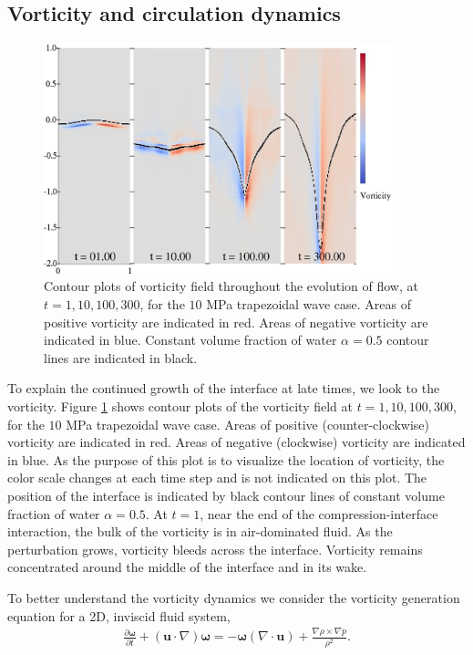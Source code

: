 \subsection{Vorticity and circulation dynamics}
\begin{figure}[h] 
  \centering
  \includegraphics[width=0.9\textwidth]{./figs/lung_figs/snapshots_vorticity_t1}
  \caption[The evolution of the vorticity] {Contour plots of vorticity
    field throughout the evolution of flow, at
    $t=1, 10, 100, 300$, for the $10$ MPa trapezoidal wave case. Areas
    of positive vorticity are indicated in red. Areas of negative
    vorticity are indicated in blue. Constant volume fraction of 
    water $\alpha=0.5$ contour lines are indicated in black.}
  \label{fig:vorticity_snapshots}
\end{figure}
% 
To explain the continued growth of the interface at late times, we
look to the vorticity. Figure \ref{fig:vorticity_snapshots} shows
contour plots of the vorticity field at $t=1, 10, 100, 300$, for the
$10$ MPa trapezoidal wave case. Areas of positive (counter-clockwise)
vorticity are indicated in red. Areas of negative (clockwise)
vorticity are indicated in blue. As the purpose of this plot is to
visualize the location of vorticity, the color scale changes at each
time step and is not indicated on this plot. The position of the
interface is indicated by black contour lines of constant volume
fraction of water $\alpha=0.5$. At $t=1$, near the end of the
compression-interface interaction, the bulk of the vorticity is in
air-dominated fluid. As the perturbation grows, vorticity bleeds
across the interface. Vorticity remains concentrated around the middle
of the interface and in its wake.

To better understand the vorticity dynamics we consider the vorticity
generation equation for a 2D, inviscid fluid system,
\begin{align} \label{eq:vorticity_euler}
  \frac{\partial \boldsymbol{\omega}}{\partial t}+\left(\boldsymbol{u}\cdot\nabla\right)\boldsymbol{\omega} =%
  - \boldsymbol{\omega}\left(\nabla\cdot\boldsymbol{u}\right) + \frac{\nabla\rho\times\nabla p}{\rho^2}.%
\end{align}

